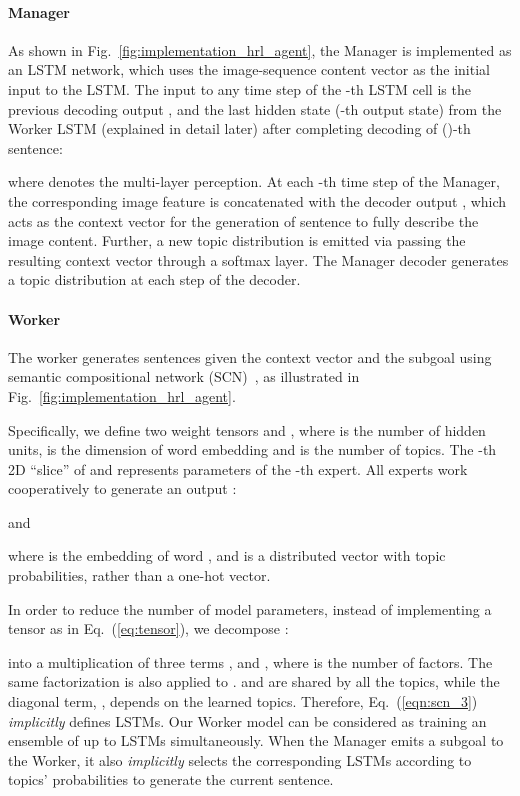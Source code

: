\documentclass[letterpaper]{article} \usepackage{aaai19}  \usepackage{times}  \usepackage{helvet}  \usepackage{courier}  \usepackage{url}  \usepackage{graphicx}
\begin{document}
\paragraph{Manager}
As shown in Fig.~\ref{fig:implementation_hrl_agent}, the Manager is implemented as an LSTM network, which uses the image-sequence content vector  as the initial input to the LSTM. 
The input to any time step of the -th LSTM cell is the previous decoding output , and the last hidden state  (-th output state) from the Worker LSTM (explained in detail later) after completing decoding of ()-th sentence:

where  denotes the multi-layer perception.
At each -th time step of the Manager, the corresponding image feature  is concatenated with the decoder output , which acts as the context vector  for the generation of sentence  to fully describe the image content. Further, a new topic distribution  is emitted via passing the resulting context vector  through a softmax layer. 
The Manager decoder generates a topic distribution  at each step of the decoder.
\paragraph{Worker}
The worker generates sentences given the context vector  and the subgoal  using semantic compositional network (SCN)~\cite{SCN_CVPR2017}, as illustrated in Fig.~\ref{fig:implementation_hrl_agent}. 

Specifically, we define two weight tensors  and , where  is the number of hidden units,  is the dimension of word embedding and  is the number of topics. The -th 2D ``slice'' of  and  represents parameters of the -th expert. All  experts work cooperatively to generate an output :
 
and

\begin{adjustbox}{minipage=1.08\linewidth,scale=0.93}
	
\end{adjustbox}
where  is the embedding of word , and  is a distributed vector with topic probabilities, rather than a one-hot vector. 

In order to reduce the number of model parameters, instead of implementing a tensor as in Eq.~(\ref{eq:tensor}), we decompose :

into a multiplication of three terms ,  and , where  is the number of factors.
The same factorization is also applied to . 
 and  are shared by all the topics, while the diagonal term, , depends on the learned topics. Therefore, Eq.~(\ref{eqn:scn_3}) \emph{implicitly} defines  LSTMs. Our Worker model can be considered as training an ensemble of up to  LSTMs simultaneously.
When the Manager emits a subgoal to the Worker, it also \emph{implicitly} selects the corresponding LSTMs according to  topics' probabilities to generate the current sentence.
\end{document}
